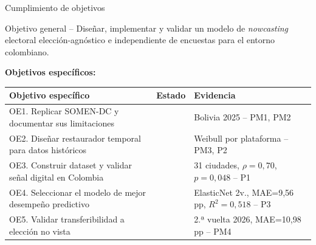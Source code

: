 \setcounter{framenumber}{35}
\makered
\begin{frame}{Cumplimiento de objetivos}
  \vspace{-0.1em}
  \begin{block}{Objetivo general -- }
    \small Diseñar, implementar y validar un modelo de \textit{nowcasting} electoral
    elección-agnóstico e independiente de encuestas para el entorno colombiano.
  \end{block}
  \vspace{0.2em}
  {\small\textbf{Objetivos específicos:}}
  \vspace{0.1em}
  \begin{center}
  {\setlength{\tabcolsep}{4pt}
  \scriptsize
  \begin{tabular}{L{6.2cm} C{1.6cm} L{4.0cm}}
    \toprule
    {\color{white}\textbf{Objetivo específico}} &
    {\color{white}\textbf{Estado}} &
    {\color{white}\textbf{Evidencia}} \\
    \midrule
    OE1. Replicar SOMEN-DC y documentar sus limitaciones &
       & Bolivia 2025 -- PM1, PM2 \\
    OE2. Diseñar restaurador temporal para datos históricos &
       & Weibull por plataforma -- PM3, P2 \\
    OE3. Construir dataset y validar señal digital en Colombia &
       & 31 ciudades, $\rho=0{,}70$, $p=0{,}048$ -- P1 \\
    OE4. Seleccionar el modelo de mejor desempeño predictivo &
       & ElasticNet 2v., MAE=9,56 pp, $R^2=0{,}518$ -- P3 \\
    OE5. Validar transferibilidad a elección no vista &
       & 2.ª vuelta 2026, MAE=10,98 pp -- PM4 \\
    \bottomrule
  \end{tabular}}
  \end{center}
\end{frame}
\makeblue

\setcounter{framenumber}{37}
